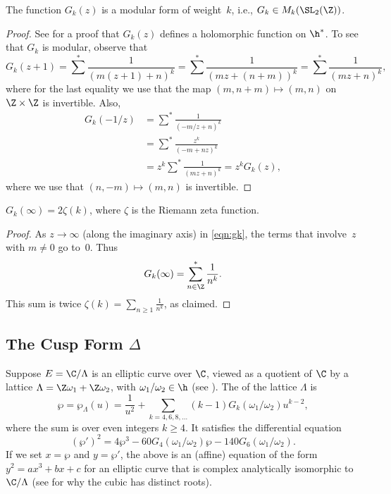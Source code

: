 \begin{proposition}
The function $G_k(z)$ is a modular form of weight~$k$, i.e.,
 $ G_k \in M_k(\SL_2(\Z))$.
\end{proposition}
\begin{proof}
See \cite[\S{} VII.2.3]{serre:arithmetic} for a proof
that $G_k(z)$ defines a holomorphic function on $\h^*$.
To see that $G_k$ is modular, observe that
$$
  G_k(z+1) = \sum^* \frac{1}{(m(z+1)+n)^k} = \sum^* \frac{1}{(mz+(n+m))^k} = 
\sum^* \frac{1}{(mz+n)^k},
$$
where for the last equality we use that the map
$(m,n+m) \mapsto (m, n)$ on $\Z\times \Z$ is invertible.
Also,
\begin{align*}
G_k(-1/z) &= \sum^* \frac{1}{(-m/z+n)^k} \\
   &= \sum^* \frac{z^k}{(-m+nz)^k}\\
   &= z^k \sum^* \frac{1}{(mz+n)^k} = z^k G_k(z),
\end{align*}
where we use that $(n,-m) \mapsto (m,n)$ is invertible.
\end{proof}

\begin{proposition}
$G_k(\infty) = 2\zeta(k)$,
where $\zeta$ is the Riemann zeta function.
\end{proposition}
\begin{proof}
As $z\to \infty$ (along the imaginary axis) in \eqref{eqn:gk},
the terms that involve~$z$ with $m\neq 0$ 
go to~$0$.  
Thus 
$$
 G_k(\infty) = \sum^*_{n\in\Z} \frac{1}{n^k}.
$$
This sum is twice $\zeta(k) = \sum_{n\geq 1} \frac{1}{n^k}$, 
as claimed.
\end{proof}



\subsection{The Cusp Form $\Delta$}
Suppose $E=\C/\Lambda$ is an elliptic curve over $\C$, viewed as a
quotient of $\C$ by a lattice $\Lambda=\Z\omega_1+\Z\omega_2$, with
$\omega_1/\omega_2\in\h$ (see \cite[\S1.4]{diamond-shurman}).  
The  of
the lattice $\Lambda$ is
$$
  \wp = \wp_{\Lambda}(u) = \frac{1}{u^2} + \sum_{k=4,6,8,\ldots} (k-1)
      G_k(\omega_1/\omega_2) u^{k-2},
$$
where the sum is over even integers $k\geq 4$.
It satisfies the differential equation
$$
  (\wp')^2 = 4\wp^3 - 60 G_4(\omega_1/\omega_2) \wp - 140 G_6(\omega_1/\omega_2).
$$
If we set $x=\wp$ and $y=\wp'$, the above is an (affine) equation of
the form $y^2 = ax^3 + bx + c$ for an elliptic curve that is complex
analytically isomorphic to $\C/\Lambda$ (see \cite[pg.~277]{ahlfors}
for why the cubic has distinct roots).

